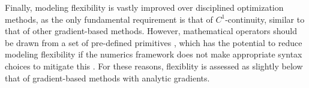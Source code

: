 \documentclass[12pt,vi,oneside]{report}
\begin{document}
\begin{appendices}
        Finally, modeling flexibility is vastly improved over disciplined optimization methods, as the only fundamental requirement is that of $C^1$-continuity, similar to that of other gradient-based methods. However, mathematical operators should be drawn from a set of pre-defined primitives \cite{ rackauckas_generalizing_2021}, which has the potential to reduce modeling flexibility if the numerics framework does not make appropriate syntax choices to mitigate this \cite{jax}. For these reasons, flexiblity is assessed as slightly below that of gradient-based methods with analytic gradients.

    \end{appendices}

    
\end{document}
